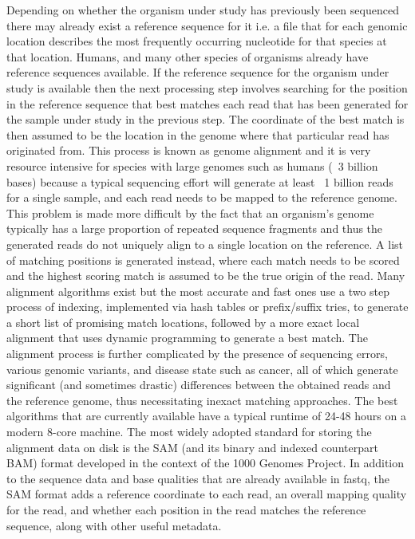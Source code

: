 Depending on whether the organism under study has previously been sequenced there may already exist a reference sequence for it i.e. a file that for each genomic location describes the most frequently occurring nucleotide for that species at that location. Humans, and many other species of organisms already have reference sequences available. If the reference sequence for the organism under study is available then the next processing step involves searching for the position in the reference sequence that best matches each read that has been generated for the sample under study in the previous step. The coordinate of the best match is then assumed to be the location in the genome where that particular read has originated from. This process is known as genome alignment and it is very resource intensive for species with large genomes such as humans (~3 billion bases) because a typical sequencing effort will generate at least ~1 billion reads for a single sample, and each read needs to be mapped to the reference genome\autocite{ruffalo2011comparative}. This problem is made more difficult by the fact that an organism's genome typically has a large proportion of repeated sequence fragments and thus the generated reads do not uniquely align to a single location on the reference. A list of matching positions is generated instead, where each match needs to be scored and the highest scoring match is assumed to be the true origin of the read. Many alignment algorithms exist but the most accurate and fast ones use a two step process of indexing, implemented via hash tables or prefix/suffix tries, to generate a short list of promising match locations, followed by a more exact local alignment that uses dynamic programming to generate a best match. The alignment process is further complicated by the presence of sequencing errors, various genomic variants, and disease state such as cancer, all of which generate significant (and sometimes drastic) differences between the obtained reads and the reference genome, thus necessitating inexact matching approaches. The best algorithms that are currently available have a typical runtime of 24-48 hours on a modern 8-core machine. The most widely adopted standard for storing the alignment data on disk is the SAM\autocite{li2009sequence} (and its binary and indexed counterpart BAM) format developed in the context of the 1000 Genomes Project. In addition to the sequence data and base qualities that are already available in fastq, the SAM format adds a reference coordinate to each read, an overall mapping quality for the read, and whether each position in the read matches the reference sequence, along with other useful metadata. 


